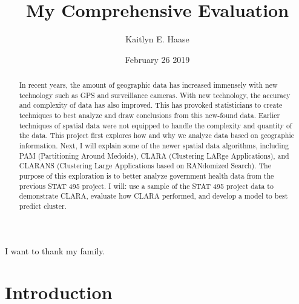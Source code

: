 \documentclass[12pt,twoside]{amherstthesis}
\title{My Comprehensive Evaluation}
\author{Kaitlyn E. Haase}
\date{February 26 2019}
\begin{document}
      \maketitle
  
  \frontmatter %
  \pagestyle{empty} %

      \begin{acknowledgements}
      I want to thank my family.
    \end{acknowledgements}
  
  

      \hypersetup{linkcolor=black}
    \setcounter{tocdepth}{2}
    \tableofcontents
  
      \listoftables
  
      \listoffigures
  
      \begin{abstract}
      In recent years, the amount of geographic data has increased immensely
      with new technology such as GPS and surveillance cameras. With new
      technology, the accuracy and complexity of data has also improved. This
      has provoked statisticians to create techniques to best analyze and draw
      conclusions from this new-found data. Earlier techniques of spatial data
      were not equipped to handle the complexity and quantity of the data.
      This project first explores how and why we analyze data based on
      geographic information. Next, I will explain some of the newer spatial
      data algorithms, including PAM (Partitioning Around Medoids), CLARA
      (Clustering LARge Applications), and CLARANS (Clustering Large
      Applications based on RANdomized Search). The purpose of this
      exploration is to better analyze government health data from the
      previous STAT 495 project. I will: use a sample of the STAT 495 project
      data to demonstrate CLARA, evaluate how CLARA performed, and develop a
      model to best predict cluster.
    \end{abstract}
  
  
  \mainmatter %
  \pagestyle{fancyplain} %

  \onehalfspacing
  
  \chapter*{Introduction}\label{introduction}
  
\end{document}
